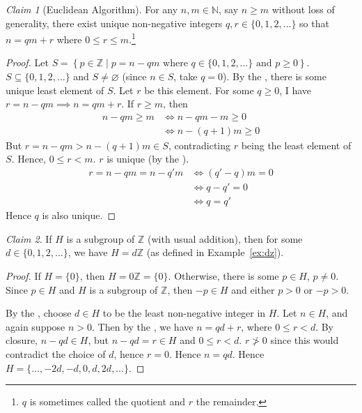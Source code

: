 \documentclass[12pt,letterpaper,DIV=11,final]{scrartcl}
\theoremstyle{plain}
\theoremstyle{definition}
\theoremstyle{remark}
\newtheorem{claim}{Claim}
\begin{document}
\begin{claim}[Euclidean Algorithm]\label{claim:euclideanalg}
  For any $n, m \in \mathbb{N}$, say $n \geq m$ without loss of generality, there exist unique non-negative integers $q, r \in \{ 0, 1, 2, \dots \}$ so that $n = qm + r$ where $0 \leq r \leq m$.\footnote{$q$ is sometimes called the quotient and $r$ the remainder.}

  \begin{proof}
    Let $S = \left\{ p \in \mathbb{Z} \mid p = n - qm \text{ where } q \in \{ 0, 1, 2, \dots \} \text{ and } p \geq 0 \right\}$.
    $S \subseteq \{ 0, 1, 2, \dots \}$ and $S \neq \varnothing$ (since $n \in S$, take $q = 0$).
    By the , there is some unique least element of $S$.
    Let $r$ be this element.
    For some $q \geq 0$, I have $r = n - qm \implies n = qm + r$.
    If $r \geq m$, then
    \begin{align*}
      n - qm \geq m &\iff n - qm -m \geq 0 \\
                    &\iff n - (q + 1) m \geq 0
    \end{align*}
    But $r = n - qm > n - (q + 1) m \in S$, contradicting $r$ being the least element of $S$.
    Hence, $0 \leq r < m$.
    $r$ is unique (by the ).
    \begin{align*}
      r = n - qm = n - q' m &\iff (q' - q) m = 0 \\
                            &\iff q - q' = 0 \\
                            &\iff q = q'
    \end{align*}
    Hence $q$ is also unique.
  \end{proof}
\end{claim}

\begin{claim}\label{claim:subgroups_of_z}
  If $H$ is a subgroup of $\mathbb{Z}$ (with usual addition), then for some $d \in \{ 0, 1, 2, \dots \}$, we have $H = d\mathbb{Z}$ (as defined in Example~\ref{ex:dz}).

  \begin{proof}
    If $H = \{ 0 \}$, then $H = 0 \mathbb{Z} = \{ 0 \}$.
    Otherwise, there is some $p \in H$, $p \neq 0$.
    Since $p \in H$ and $H$ is a subgroup of $\mathbb{Z}$, then $-p \in H$ and either $p > 0$ or $-p > 0$.

    By the , choose $d \in H$ to be the least non-negative integer in $H$.
    Let $n \in H$, and again suppose $n > 0$.
    Then by the , we have $n = qd + r$, where $0 \leq r < d$.
    By closure, $n - qd \in H$, but $n - qd = r \in H$ and $0 \leq r < d$.
    $r \ngtr 0$ since this would contradict the choice of $d$, hence $r = 0$.
    Hence $n = qd$.
    Hence $H = \{ \dots, -2d, -d, 0, d, 2d, \dots \}$.
  \end{proof}
\end{claim}
\end{document}
